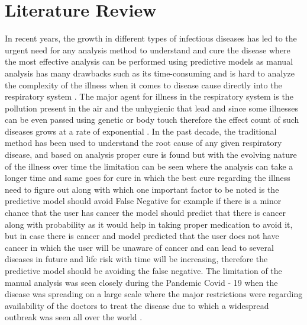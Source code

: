 \chapter{Literature Review}
\label{ch:lit_rev} %

In recent years, the growth in different types of infectious diseases has led to the urgent need for any analysis method to understand and cure the disease where the most effective analysis can be performed using predictive models as manual analysis has many drawbacks such as its time-consuming and is hard to analyze the complexity of the illness when it comes to disease cause directly into the respiratory system \cite{haux2019research}. The major agent for illness in the respiratory system is the pollution present in the air and the unhygienic that lead and since some illnesses can be even passed using genetic or body touch therefore the effect count of such diseases grows at a rate of exponential \cite{madubueze2020controlling}. In the past decade, the traditional method has been used to understand the root cause of any given respiratory disease, and based on analysis proper cure is found but with the evolving nature of the illness over time the limitation can be seen where the analysis can take a longer time and same goes for cure in which the best cure regarding the illness need to figure out along with which one important factor to be noted is the predictive model should avoid False Negative for example if there is a minor chance that the user has cancer the model should predict that there is cancer along with probability as it would help in taking proper medication to avoid it, but in case there is cancer and model predicted that the user does not have cancer in which the user will be unaware of cancer and can lead to several diseases in future and life risk with time will be increasing, therefore the predictive model should be avoiding the false negative. The limitation of the manual analysis was seen closely during the Pandemic Covid - 19 when the disease was spreading on a large scale where the major restrictions were regarding availability of the doctors to treat the disease due to which a widespread outbreak was seen all over the world \cite{madubueze2020controlling}.

\textbf{}

